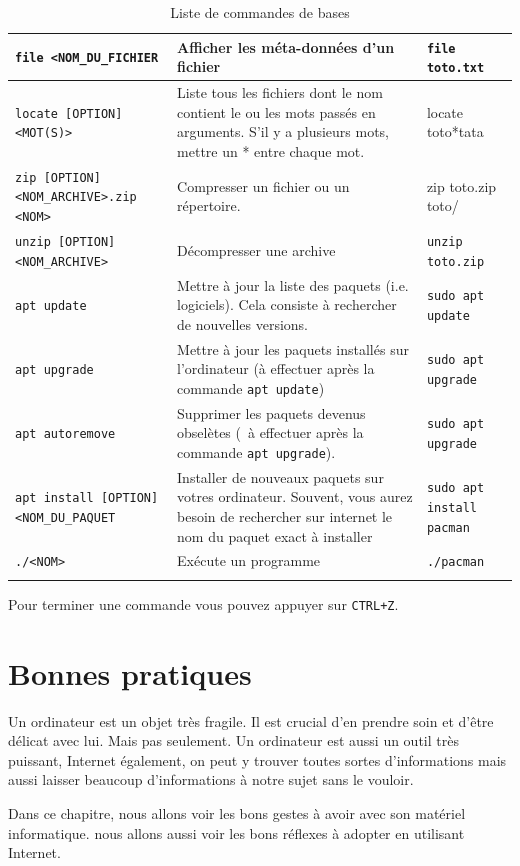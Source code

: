 \documentclass[12pt]{book}
\begin{document}
\begin{longtable}{|p{}|p{}|p{}|}
		\texttt{file <NOM\_DU\_FICHIER} & Afficher les méta-données d'un fichier & \texttt{file toto.txt}\\\hline
		\texttt{locate [OPTION] <MOT(S)>} & Liste tous les fichiers dont le nom contient le ou les mots passés en arguments. S'il y a plusieurs mots, mettre un * entre chaque mot. & locate toto*tata\\\hline
		\texttt{zip [OPTION] <NOM\_ARCHIVE>.zip <NOM>} & Compresser un fichier ou un répertoire. & zip toto.zip toto/\\\hline
		\texttt{unzip [OPTION] <NOM\_ARCHIVE>} & Décompresser une archive & \texttt{unzip toto.zip}\\\hline
		\texttt{apt update} & Mettre à jour la liste des paquets (i.e. logiciels). Cela consiste à rechercher de nouvelles versions. & \texttt{sudo apt update}\\\hline
		\texttt{apt upgrade} & Mettre à jour les paquets  installés sur l'ordinateur (à effectuer après la commande \texttt{apt update}) & \texttt{sudo apt upgrade}\\\hline
		\texttt{apt autoremove} & Supprimer les paquets devenus obselètes (\ à effectuer après la commande \texttt{apt upgrade}). & \texttt{sudo apt upgrade}\\\hline
		\texttt{apt install [OPTION] <NOM\_DU\_PAQUET} & Installer de nouveaux paquets sur votres ordinateur. Souvent, vous aurez besoin de rechercher sur internet le nom du paquet exact à installer & \texttt{sudo apt install pacman}\\\hline
		\texttt{./<NOM>} & Exécute un programme & \texttt{./pacman}\\\hline
	\caption{Liste de commandes de bases}
	\label{tab:commande}
	\end{longtable}\par
	Pour terminer une commande vous pouvez appuyer sur \texttt{CTRL+Z}.

\chapter{Bonnes pratiques}
	Un ordinateur est un objet très fragile. 
	Il est crucial d'en prendre soin et d'être délicat avec lui.
	Mais pas seulement. 
	Un ordinateur est aussi un outil très puissant, Internet également, on peut y trouver toutes sortes d'informations mais aussi laisser beaucoup d'informations à notre sujet sans le vouloir.\par
	Dans ce chapitre, nous allons voir les bons gestes à avoir avec son matériel informatique.
	nous allons aussi voir les bons réflexes à adopter en utilisant Internet.
\end{document}
